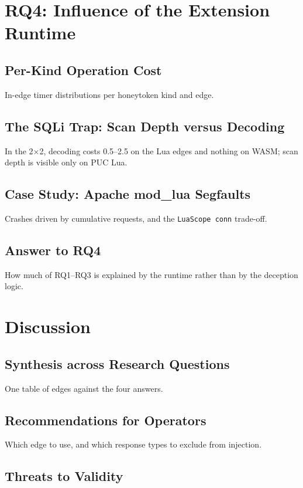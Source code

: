 \documentclass{rptuma}
\begin{document}
\chapter{RQ4: Influence of the Extension Runtime}
\section{Per-Kind Operation Cost}
In-edge timer distributions per honeytoken kind and edge.
\section{The SQLi Trap: Scan Depth versus Decoding}
In the 2$\times$2, decoding costs 0.5--2.5\us{} on the Lua edges and nothing on WASM; scan depth
is visible only on PUC Lua.
\section{Case Study: Apache mod\_lua Segfaults}
Crashes driven by cumulative requests, and the \texttt{LuaScope conn} trade-off.
\section{Answer to RQ4}
How much of RQ1--RQ3 is explained by the runtime rather than by the deception logic.

\chapter{Discussion}
\section{Synthesis across Research Questions}
One table of edges against the four answers.
\section{Recommendations for Operators}
Which edge to use, and which response types to exclude from injection.
\section{Threats to Validity}
\end{document}
